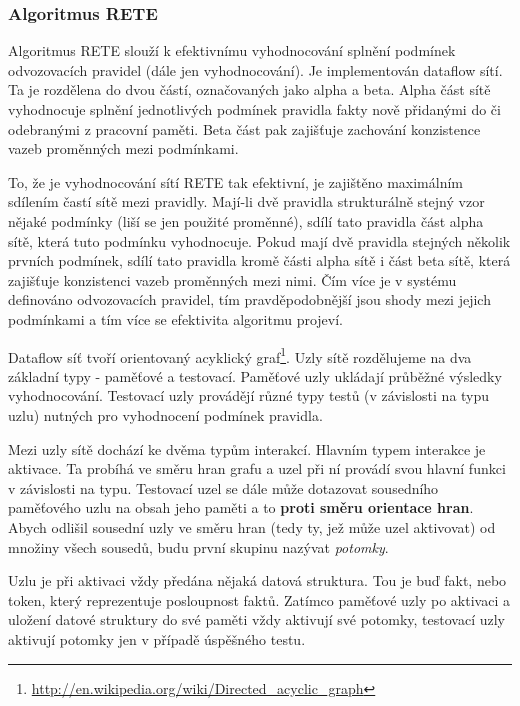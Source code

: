\subsubsection{Algoritmus RETE}
\label{rete}

Algoritmus RETE slouží k efektivnímu vyhodnocování splnění podmínek odvozovacích
pravidel (dále jen vyhodnocování). Je implementován dataflow sítí. Ta je
rozdělena do dvou částí, označovaných jako alpha a beta. Alpha část sítě
vyhodnocuje splnění jednotlivých podmínek pravidla fakty nově přidanými do či
odebranými z pracovní paměti. Beta část pak zajišťuje zachování konzistence
vazeb proměnných mezi podmínkami.

To, že je vyhodnocování sítí RETE tak efektivní, je zajištěno maximálním
sdílením častí sítě mezi pravidly. Mají-li dvě pravidla strukturálně stejný vzor
nějaké podmínky (liší se jen použité proměnné), sdílí tato pravidla část alpha
sítě, která tuto podmínku vyhodnocuje. Pokud mají dvě pravidla stejných několik
prvních podmínek, sdílí tato pravidla kromě části alpha sítě i část beta sítě,
která zajišťuje konzistenci vazeb proměnných mezi nimi. Čím více je v systému
definováno odvozovacích pravidel, tím pravděpodobnější jsou shody mezi jejich
podmínkami a tím více se efektivita algoritmu projeví.

Dataflow síť tvoří orientovaný acyklický
graf\footnote{\url{http://en.wikipedia.org/wiki/Directed_acyclic_graph}}. Uzly
sítě rozdělujeme na dva základní typy - paměťové a testovací. Paměťové uzly
ukládají průběžné výsledky vyhodnocování. Testovací uzly provádějí různé typy
testů (v závislosti na typu uzlu) nutných pro vyhodnocení podmínek pravidla.

Mezi uzly sítě dochází ke dvěma typům interakcí. Hlavním typem interakce je
aktivace. Ta probíhá ve směru hran grafu a uzel při ní provádí svou hlavní
funkci v závislosti na typu. Testovací uzel se dále může dotazovat sousedního
paměťového uzlu na obsah jeho paměti a to \textbf{proti směru orientace hran}.
Abych odlišil sousední uzly ve směru hran (tedy ty, jež může uzel aktivovat) od
množiny všech sousedů, budu první skupinu nazývat \emph{potomky}.

Uzlu je při aktivaci vždy předána nějaká datová struktura. Tou je buď fakt, nebo
token, který reprezentuje posloupnost faktů. Zatímco paměťové uzly po aktivaci a
uložení datové struktury do své paměti vždy aktivují své potomky, testovací uzly
aktivují potomky jen v případě úspěšného testu.

